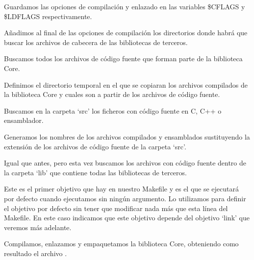  
 Guardamos las opciones de compilación y enlazado en las variables \$CFLAGS y \$LDFLAGS respectivamente.
 
 
 Añadimos al final de las opciones de compilación los directorios donde habrá que buscar los archivos de cabecera de las bibliotecas de terceros.


Buscamos todos los archivos de código fuente que forman parte de la biblioteca Core.
 

 Definimos el directorio temporal en el que se copiaran los archivos compilados de la biblioteca Core y cuales son a partir de los archivos de código fuente.
 
 
 Buscamos en la carpeta `src' los ficheros con código fuente en C, C++ o ensamblador.

 
 Generamos los nombres de los archivos compilados y ensamblados sustituyendo la extensión de los archivos de código fuente de la carpeta `src'.
 
 
 Igual que antes, pero esta vez buscamos los archivos con código fuente dentro de la carpeta `lib' que contiene todas las bibliotecas de terceros.
 
 
 Este es el primer objetivo que hay en nuestro Makefile y es el que se ejecutará por defecto cuando ejecutamos  sin ningún argumento. Lo utilizamos para definir el objetivo por defecto sin tener que modificar nada más que esta línea del Makefile. En este caso indicamos que este objetivo depende del objetivo `link' que veremos más adelante.
 
 
 Compilamos, enlazamos y empaquetamos la biblioteca Core, obteniendo como resultado el archivo .
 
